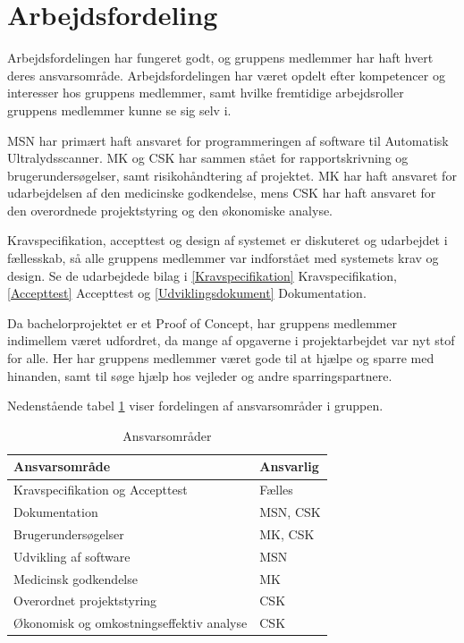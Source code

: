 \section{Arbejdsfordeling}
Arbejdsfordelingen har fungeret godt, og gruppens medlemmer har haft hvert deres ansvarsområde. Arbejdsfordelingen har været opdelt efter kompetencer og interesser hos gruppens medlemmer, samt hvilke fremtidige arbejdsroller gruppens medlemmer kunne se sig selv i.

MSN har primært haft ansvaret for programmeringen af software til Automatisk Ultralydsscanner. MK og CSK har sammen stået for rapportskrivning og brugerundersøgelser, samt risikohåndtering af projektet. MK har haft ansvaret for udarbejdelsen af den medicinske godkendelse, mens CSK har haft ansvaret for den overordnede projektstyring og den økonomiske analyse.

Kravspecifikation, accepttest og design af systemet er diskuteret og udarbejdet i fællesskab, så alle gruppens medlemmer var indforstået med systemets krav og design. Se de udarbejdede bilag i \ref{Kravspecifikation} Kravspecifikation, \ref{Accepttest} Accepttest og \ref{Udviklingsdokument} Dokumentation.

Da bachelorprojektet er et Proof of Concept, har gruppens medlemmer indimellem været udfordret, da mange af opgaverne i projektarbejdet var nyt stof for alle. Her har gruppens medlemmer været gode til at hjælpe og sparre med hinanden, samt til søge hjælp hos vejleder og andre sparringspartnere.  

Nedenstående tabel \ref{ansvarstabel} viser fordelingen af ansvarsområder i gruppen. 

\begin{table}[h]
\centering
\begin{tabular}{|l| p{}|}
\hline
\textbf{Ansvarsområde} &  \textbf{Ansvarlig} \\\hline
Kravspecifikation og Accepttest & Fælles \\\hline
Dokumentation & MSN, CSK\\\hline
Brugerundersøgelser & MK, CSK \\\hline
Udvikling af software & MSN\\\hline
Medicinsk godkendelse & MK \\\hline
Overordnet projektstyring & CSK \\\hline
Økonomisk og omkostningseffektiv analyse & CSK \\\hline
\end{tabular}
\caption{Ansvarsområder}
\label{ansvarstabel}
\end{table}

